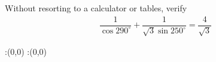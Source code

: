 
%
%
%
%
% 
% 

\question Without resorting to a calculator or tables, verify
\begin{align}
  \dfrac{1}{\cos 290^\circ}+\dfrac{1}{\sqrt{3}\sin 250^\circ} 
    = \dfrac{4}{\sqrt{3}} \nonumber
\end{align}

\insertQR{}

\ifprintanswers
  \begin{marginfigure}
      :(0,0)
      :(0,0)
    \figdrawbegin{}
      \figdrawline [100,101]
    \figdrawend
    \figvisu{\figBoxA}{}{%
    }
    \centerline{\box\figBoxA}
  \end{marginfigure}
\fi 


